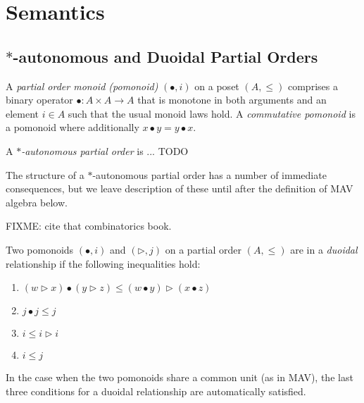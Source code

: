 \section{Semantics}\label{sec:mav-semantics}

\subsection{$*$-autonomous and Duoidal Partial Orders}

\begin{definition}
  A \emph{partial order monoid (pomonoid)} $(\bullet, i)$ on a poset
  $(A, \leq)$ comprises a binary operator $\bullet : A \times A \to A$
  that is monotone in both arguments and an element $i \in A$ such
  that the usual monoid laws hold. A \emph{commutative pomonoid} is a
  pomonoid where additionally $x \bullet y = y \bullet x$.
\end{definition}

\begin{definition}
  A \emph{$*$-autonomous partial order} is ... TODO

  
\end{definition}

\begin{remark}
  The structure of a $*$-autonomous partial order has a number of
  immediate consequences, but we leave description of these until
  after the definition of MAV algebra below. 
\end{remark}

FIXME: cite that combinatorics book.
\begin{definition}
  Two pomonoids $(\bullet, i)$ and $(\rhd, j)$ on a partial order
  $(A, \leq)$ are in a \emph{duoidal} relationship if the following
  inequalities hold:
  \begin{enumerate}
  \item $(w \rhd x) \bullet (y \rhd z) \leq (w \bullet y) \rhd (x \bullet z)$
  \item $j \bullet j \leq j$
  \item $i \leq i \rhd i$
  \item $i \leq j$
  \end{enumerate}
\end{definition}

\begin{remark}
  In the case when the two pomonoids share a common unit (as in MAV),
  the last three conditions for a duoidal relationship are
  automatically satisfied.
\end{remark}


